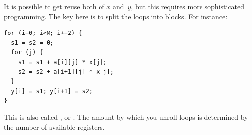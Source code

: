 It is possible to get reuse both of $x$ and~$y$, but this requires
more sophisticated programming. The key here is to split the loops into
blocks. For instance:
\begin{verbatim}
for (i=0; i<M; i+=2) {
  s1 = s2 = 0;
  for (j) {
    s1 = s1 + a[i][j] * x[j];
    s2 = s2 + a[i+1][j] * x[j];
  }
  y[i] = s1; y[i+1] = s2;
}
\end{verbatim}
This is also called ,
or . The amount by which you unroll
loops is determined by the number of available registers.


